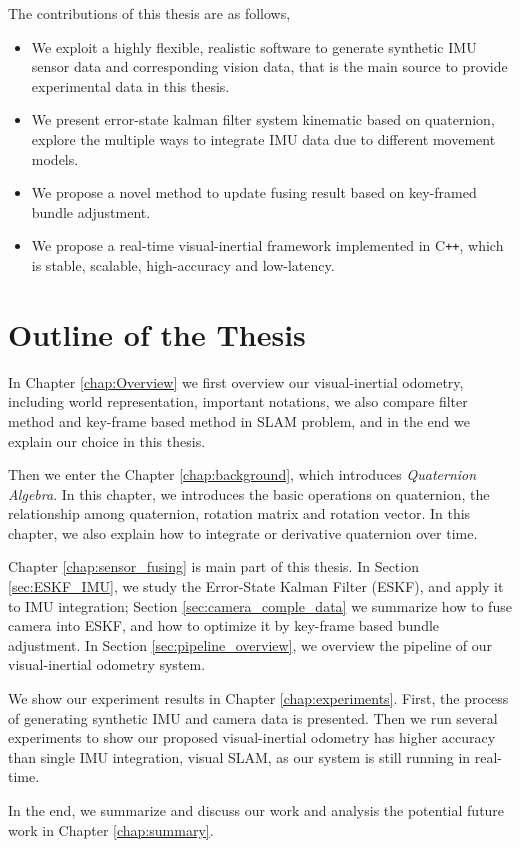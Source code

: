 The contributions of this thesis are as follows,
\begin{itemize}
\item {We exploit a highly flexible, realistic software to generate synthetic IMU sensor data and corresponding vision data, that is the main source to provide experimental data in this thesis.}
\item {We present error-state kalman filter system kinematic based on quaternion, explore the multiple ways to integrate IMU data due to different movement models.}
\item {We propose a novel method to update fusing result based on key-framed bundle adjustment.}
\item {We propose a real-time visual-inertial framework implemented in C\texttt{++}, which is stable, scalable, high-accuracy and low-latency.}
\end{itemize}

\section{Outline of the Thesis}
\label{sec:outline}

In Chapter \ref{chap:Overview} we first overview our visual-inertial odometry, including world representation, important notations, we also compare filter method and key-frame based method in SLAM problem, and in the end we explain our choice in this thesis.

Then we enter the Chapter \ref{chap:background}, which introduces \textit{Quaternion Algebra}. In this chapter, we introduces the basic operations on quaternion, the relationship among quaternion, rotation matrix and rotation vector. In this chapter, we also explain how to integrate or derivative quaternion over time.

Chapter \ref{chap:sensor_fusing} is main part of this thesis. In Section \ref{sec:ESKF_IMU}, we study the Error-State Kalman Filter (ESKF), and apply it to IMU integration; Section \ref{sec:camera_comple_data} we summarize how to fuse camera into ESKF, and how to optimize it by key-frame based bundle adjustment. In Section 
\ref{sec:pipeline_overview}, we overview the pipeline of our visual-inertial odometry system.

We show our experiment results in Chapter \ref{chap:experiments}. First, the process of generating synthetic IMU and camera data is presented. Then we run several experiments to show our proposed visual-inertial odometry has higher accuracy than  single IMU integration, visual SLAM, as our system is still running in real-time.

In the end, we summarize and discuss our work and analysis the potential future work in Chapter \ref{chap:summary}.
